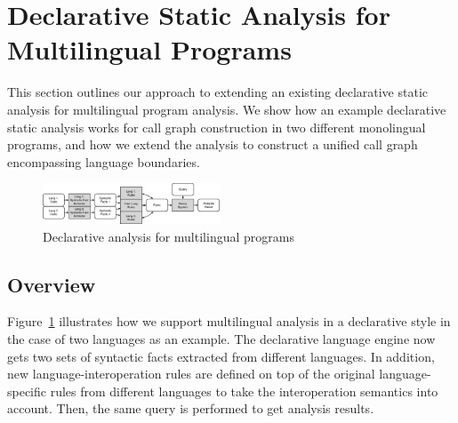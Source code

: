 
\section{Declarative Static Analysis for Multilingual Programs}
This section outlines our approach to extending an existing
declarative static analysis for multilingual program analysis.
We show how an example declarative static analysis works
for call graph construction in two different monolingual programs, and
how we extend the analysis to construct a unified call graph
encompassing language boundaries.

\begin{figure}[t]
  \centering
  \vspace{2mm}
  \includegraphics[width=0.47\textwidth]{img/ov2.pdf}
  \caption{Declarative analysis for multilingual programs}
  \label{fig:ov2}
\end{figure}

\subsection{Overview}
Figure~\ref{fig:ov2} illustrates how we support multilingual analysis in a
declarative style in the case of two languages as an example. The declarative
language engine now gets two sets of syntactic facts extracted from different
languages. In addition, new language-interoperation rules are defined on top of
the original language-specific rules from different languages to take the
interoperation semantics into account. Then, the same query is performed to get
analysis results.

